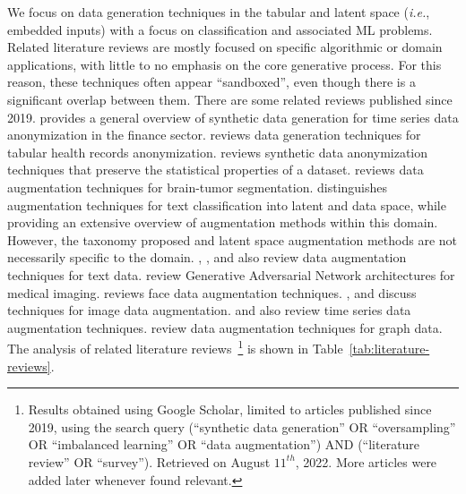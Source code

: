 We focus on data generation techniques in the tabular and latent space
(\textit{i.e.}, embedded inputs) with a focus on classification and associated
ML problems. Related literature reviews are mostly focused on specific
algorithmic or domain applications, with little to no emphasis on the core
generative process. For this reason, these techniques often appear
``sandboxed'', even though there is a significant overlap between them. There
are some related reviews published since 2019. \citet{assefa2020generating}
provides a general overview of synthetic data generation for time series data
anonymization in the finance sector. \citet{hernandez2022synthetic} reviews
data generation techniques for tabular health records anonymization.
\citet{raghunathan2021synthetic} reviews synthetic data anonymization
techniques that preserve the statistical properties of a dataset.
\citet{nalepa2019data} reviews data augmentation techniques for brain-tumor
segmentation. \citet{bayer2021survey} distinguishes augmentation techniques
for text classification into latent and data space, while providing an
extensive overview of augmentation methods within this domain. However, the
taxonomy proposed and latent space augmentation methods are not necessarily
specific to the domain. \citet{shorten2021text}, \citet{chen2021empirical},
\citet{feng2021survey} and \citet{liu2020survey} also review data augmentation
techniques for text data.  \citet{yi2019generative} review Generative
Adversarial Network architectures for medical imaging. \citet{wang2020survey}
reviews face data augmentation techniques. \citet{Shorten2019},
\citet{khosla2020enhancing} and \citet{khalifa2021comprehensive} discuss
techniques for image data augmentation.  \citet{Iwana2021} and
\citet{wen2020time} also review time series data augmentation techniques.
\citet{zhao2022graph} review data augmentation techniques for graph data. The
analysis of related literature reviews~\footnote{Results obtained using Google
    Scholar, limited to articles published since 2019, using the search query
    {\selectfont (``synthetic data generation'' OR
        ``oversampling'' OR ``imbalanced learning'' OR ``data augmentation'')
        AND (``literature review'' OR ``survey'')}. Retrieved on August
    $11^{th}$, 2022. More articles were added later whenever found relevant.
} is shown in Table~\ref{tab:literature-reviews}.

